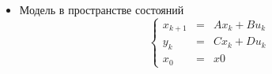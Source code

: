 \documentclass[12pt]{article}
\begin{document}
\begin{itemize}


\item Модель в пространстве состояний
$$ \left\{\begin{array}{rcl}
  x_{k+1} & = & Ax_k+Bu_k \\
  y_k & = & Cx_k+Du_k \\
  x_0 & = & x0
\end{array}\right. $$

\end{itemize}
\end{document}
